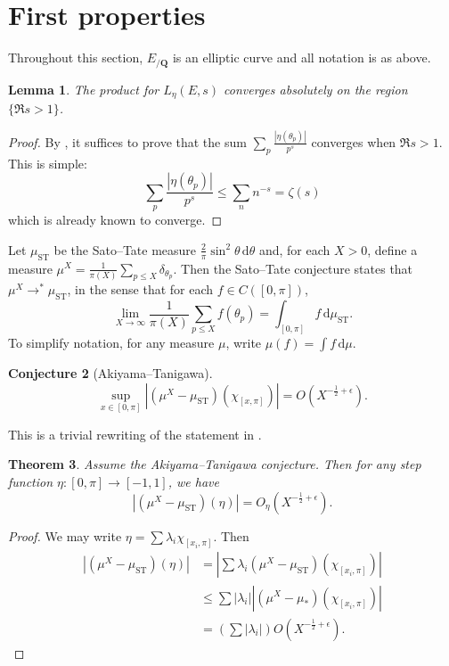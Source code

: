 \documentclass{article}
\newcommand{\bQ}{\mathbf{Q}}
\newcommand{\dd}{\mathrm{d}}
\newcommand{\ST}{\mathrm{ST}}
\newtheorem{theorem}{Theorem}
\newtheorem{conjecture}[theorem]{Conjecture}
\newtheorem{lemma}[theorem]{Lemma}
\numberwithin{theorem}{section}
\begin{document}
\section{First properties}

Throughout this section, $E_{/\bQ}$ is an elliptic curve and all notation is as 
above. 

\begin{lemma}
The product for $L_\eta(E,s)$ converges absolutely on the region 
$\{\Re s>1\}$. 
\end{lemma}
\begin{proof}
By \cite[\S3.7, Th.~5]{knopp-1956}, it suffices to prove that the sum 
$\sum_p \frac{|\eta(\theta_p)|}{p^s}$ converges when $\Re s>1$. This is 
simple: 
\[
	\sum_p \frac{|\eta(\theta_p)|}{p^s} \leqslant \sum_n n^{-s} = \zeta(s)
\]
which is already known to converge. 
\end{proof}

Let $\mu_\ST$ be the Sato--Tate measure 
$\frac{2}{\pi}\sin^2\theta\, \dd \theta$ and, for each $X>0$, define a measure 
$\mu^X=\frac{1}{\pi(X)}\sum_{p\leqslant X} \delta_{\theta_p}$. Then the 
Sato--Tate conjecture states that $\mu^X\to^\ast \mu_\ST$, in the sense that 
for each $f\in C([0,\pi])$, 
\[
	\lim_{X\to \infty} \frac{1}{\pi(X)} \sum_{p\leqslant X} f(\theta_p) = \int_{[0,\pi]} f\, \dd \mu_\ST .
\]
To simplify notation, for any measure $\mu$, write $\mu(f)=\int f\, \dd \mu$. 

\begin{conjecture}[Akiyama--Tanigawa]
\[
	\sup_{x\in [0,\pi]} \left| (\mu^X - \mu_\ST)(\chi_{[x,\pi]})\right| = O(X^{-\frac 1 2+\epsilon}) .
\]
\end{conjecture}
This is a trivial rewriting of the statement in 
\cite[Conj.~1]{akiyama-tanigawa}. 

\begin{theorem}
Assume the Akiyama--Tanigawa conjecture. Then for any step function 
$\eta\colon [0,\pi] \to [-1,1]$, we have 
\[
	\left| (\mu^X-\mu_\ST)(\eta)\right| = O_\eta(X^{-\frac 1 2+\epsilon}) .
\]
\end{theorem}
\begin{proof}
We may write $\eta = \sum \lambda_i \chi_{[x_i,\pi]}$. Then 
\begin{align*}
	\left| (\mu^X-\mu_\ST)(\eta)\right|
		&= \left| \sum \lambda_i (\mu^X-\mu_\ST)(\chi_{[x_i,\pi]}) \right| \\
		&\leqslant \sum |\lambda_i| \left| (\mu^X-\mu_\ast)(\chi_{[x_i,\pi]})\right| \\
		&= \left(\sum |\lambda_i|\right) O(X^{-\frac 1 2+\epsilon}) .
\end{align*}
\end{proof}





\printbibliography
\end{document}
